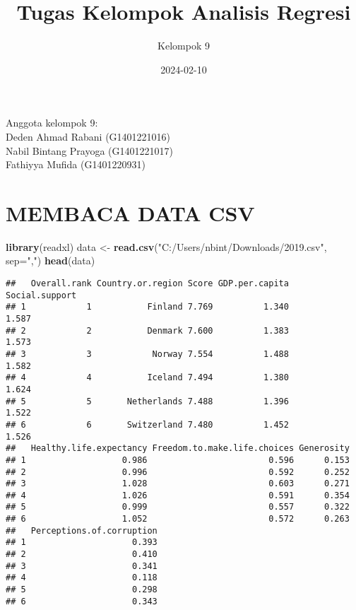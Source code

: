 \documentclass[
]{article}
\title{Tugas Kelompok Analisis Regresi}
\author{Kelompok 9}
\date{2024-02-10}
\newenvironment{Shaded}{\begin{snugshade}}{\end{snugshade}}
\newcommand{\AttributeTok}[1]{\textcolor[rgb]{0.13,0.29,0.53}{#1}}
\newcommand{\FunctionTok}[1]{\textcolor[rgb]{0.13,0.29,0.53}{\textbf{#1}}}
\newcommand{\NormalTok}[1]{#1}
\newcommand{\OtherTok}[1]{\textcolor[rgb]{0.56,0.35,0.01}{#1}}
\newcommand{\StringTok}[1]{\textcolor[rgb]{0.31,0.60,0.02}{#1}}
\begin{document}
\maketitle

Anggota kelompok 9:\\
Deden Ahmad Rabani (G1401221016)\\
Nabil Bintang Prayoga (G1401221017)\\
Fathiyya Mufida (G1401220931)

\hypertarget{membaca-data-csv}{%
\section{\texorpdfstring{ MEMBACA DATA
CSV}{ MEMBACA DATA CSV}}\label{membaca-data-csv}}

\begin{Shaded}
\begin{Highlighting}[]
\FunctionTok{library}\NormalTok{(readxl)}
\NormalTok{data }\OtherTok{\textless{}{-}} \FunctionTok{read.csv}\NormalTok{(}\StringTok{"C:/Users/nbint/Downloads/2019.csv"}\NormalTok{, }\AttributeTok{sep=}\StringTok{","}\NormalTok{)}
\FunctionTok{head}\NormalTok{(data)}
\end{Highlighting}
\end{Shaded}

\begin{verbatim}
##   Overall.rank Country.or.region Score GDP.per.capita Social.support
## 1            1           Finland 7.769          1.340          1.587
## 2            2           Denmark 7.600          1.383          1.573
## 3            3            Norway 7.554          1.488          1.582
## 4            4           Iceland 7.494          1.380          1.624
## 5            5       Netherlands 7.488          1.396          1.522
## 6            6       Switzerland 7.480          1.452          1.526
##   Healthy.life.expectancy Freedom.to.make.life.choices Generosity
## 1                   0.986                        0.596      0.153
## 2                   0.996                        0.592      0.252
## 3                   1.028                        0.603      0.271
## 4                   1.026                        0.591      0.354
## 5                   0.999                        0.557      0.322
## 6                   1.052                        0.572      0.263
##   Perceptions.of.corruption
## 1                     0.393
## 2                     0.410
## 3                     0.341
## 4                     0.118
## 5                     0.298
## 6                     0.343
\end{verbatim}
\end{document}
